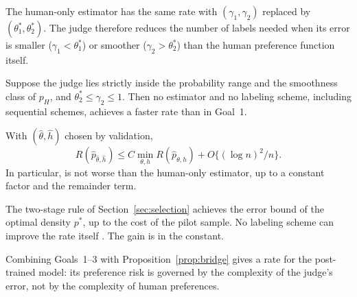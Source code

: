 The human-only estimator has the same rate with $(\gamma_1,\gamma_2)$ replaced by
$(\theta_1^{*},\theta_2^{*})$. The judge therefore reduces the number of labels needed when its error
is smaller ($\gamma_1<\theta_1^{*}$) or smoother ($\gamma_2>\theta_2^{*}$) than the human preference
function itself.

\begin{goal}[Optimality]
Suppose the judge lies strictly inside the probability range and the smoothness class of $p_H$,
and $\theta_2^{*}\le\gamma_2\le1$. Then no estimator and no labeling scheme, including sequential
schemes, achieves a faster rate than in Goal~1.
\end{goal}

\begin{goal}[Adaptation]
With $(\hat\theta,\hat h)$ chosen by validation,
\[
  R(\hat p_{\hat\theta,\hat h})\le C\min_{\theta,h}R(\hat p_{\theta,h})+O\{(\log n)^2/n\}.
\]
In particular, \dfsp{} is not worse than the human-only estimator, up to a constant factor and the
remainder term.
\end{goal}

\begin{goal}
The two-stage rule of Section~\ref{sec:selection} achieves the error bound of the optimal density
$p^{*}$, up to the cost of the pilot sample. No labeling scheme can improve the rate itself
\citep{castro2005faster}. The gain is in the constant.
\end{goal}

Combining Goals~1--3 with Proposition~\ref{prop:bridge} gives a rate for the post-trained model: its
preference risk is governed by the complexity of the judge's error, not by the complexity of human
preferences.
